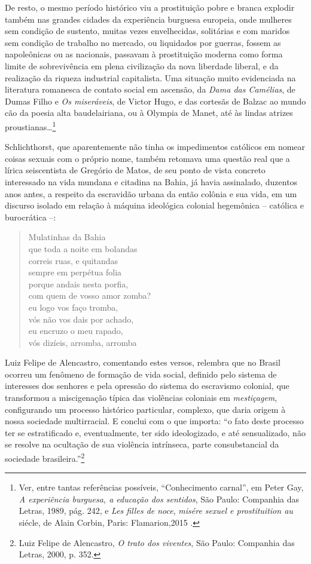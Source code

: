 De resto, o mesmo período histórico viu a prostituição pobre e branca
explodir também nas grandes cidades da experiência burguesa europeia,
onde mulheres sem condição de sustento, muitas vezes envelhecidas,
solitárias e com maridos sem condição de trabalho no mercado, ou
liquidados por guerras, fossem as napoleônicas ou as nacionais, passavam
à prostituição moderna como forma limite de sobrevivência em plena
civilização da nova liberdade liberal, e da realização da riqueza
industrial capitalista. Uma situação muito evidenciada na literatura
romanesca de contato social em ascensão, da \emph{Dama das Camélias}, de
Dumas Filho e \emph{Os miseráveis}, de Victor Hugo, e das cortesãs de
Balzac ao mundo cão da poesia alta baudelairiana, ou à Olympia de Manet,
até às lindas atrizes proustianas\ldots{}\footnote{Ver, entre tantas
  referências possíveis, ``Conhecimento carnal'', em Peter Gay, \emph{A
  experiência burguesa, a educação dos sentidos}, São Paulo: Companhia
  das Letras, 1989, pág. 242, e \emph{Les filles de noce}, \emph{misére
  sexuel e prostituition au } siécle, de Alain Corbin, Paris:
  Flamarion,2015 .}

Schlichthorst, que aparentemente não tinha os impedimentos católicos em
nomear coisas sexuais com o próprio nome, também retomava uma questão
real que a lírica seiscentista de Gregório de Matos, de seu ponto de
vista concreto interessado na vida mundana e citadina na Bahia, já havia
assinalado, duzentos anos antes, a respeito da escravidão urbana da
então colônia e sua vida, em um discurso isolado em relação à máquina
ideológica colonial hegemônica -- católica e burocrática --:

\begin{verse}
Mulatinhas da Bahia\\
que toda a noite em bolandas\\
correis ruas, e quitandas\\
sempre em perpétua folia\\
porque andais nesta porfia,\\
com quem de vosso amor zomba?\\
eu logo vos faço tromba,\\
vós não vos dais por achado,\\
eu encruzo o meu rapado,\\
vós dizíeis, arromba, arromba
\end{verse}

Luiz Felipe de Alencastro, comentando estes versos, relembra que no
Brasil ocorreu um fenômeno de formação de vida social, definido pelo
sistema de interesses dos senhores e pela opressão do sistema do
escravismo colonial, que transformou a miscigenação típica das
violências coloniais em \emph{mestiçagem}, configurando um processo
histórico particular, complexo, que daria origem à nossa sociedade
multirracial. E conclui com o que importa: ``o fato deste processo ter
se estratificado e, eventualmente, ter sido ideologizado, e até
sensualizado, não se resolve na ocultação de sua violência intrínseca,
parte consubstancial da sociedade brasileira.''\footnote{Luiz Felipe de
  Alencastro, \emph{O trato dos viventes}, São Paulo: Companhia das
  Letras, 2000, p. 352.}

